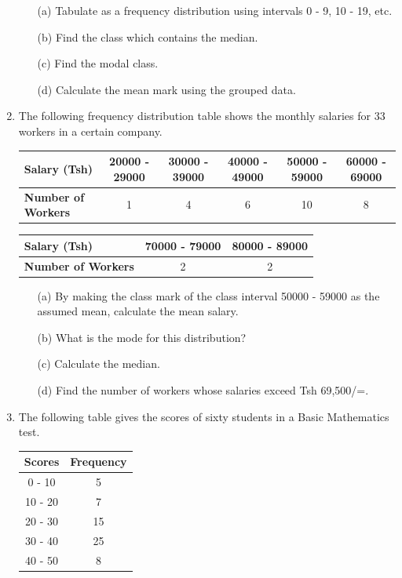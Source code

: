 \begin{enumerate}
	\begin{itemize}
	\item[(a)] Tabulate as a frequency distribution using intervals 0 - 9, 10 - 19, etc.
	\item[(b)] Find the class which contains the median.
	\item[(c)] Find the modal class.
	\item[(d)] Calculate the mean mark using the grouped data.
	\end{itemize}
	
	\item The following frequency distribution table shows the monthly salaries for 33 workers in a certain company.\\
	
	\begin{tabular}{|p{2.5cm}|c|c|c|c|c|} \hline
	\textbf{Salary (Tsh)}&20000 - 29000&30000 - 39000&40000 - 49000&50000 - 59000&60000 - 69000 \\ \hline
	\textbf{Number of Workers}&1&4&6&10&8 \\\hline
	\end{tabular}

	\begin{tabular}{|p{2.5cm}|c|c|} \hline
	\textbf{Salary (Tsh)}&70000 - 79000&80000 - 89000 \\ \hline
	\textbf{Number of Workers}&2&2 \\\hline
	\end{tabular}
	
	\begin{itemize}
	\item[(a)] By making the class mark of the class interval 50000 - 59000 as the assumed mean, calculate the mean salary.
	\item[(b)] What is the mode for this distribution?
	\item[(c)] Calculate the median.
	\item[(d)] Find the number of workers whose salaries exceed Tsh 69,500/=.
	\end{itemize}
	
	\item The following table gives the scores of sixty students in a Basic Mathematics test.\\
	
	\begin{tabular}{|c|c|} \hline
	Scores&Frequency \\ \hline
	0 - 10&5 \\ \hline
	10 - 20&7 \\ \hline
	20 - 30&15 \\ \hline
	30 - 40&25 \\ \hline
	40 - 50&8 \\ \hline
	\end{tabular}
	

\end{enumerate}
